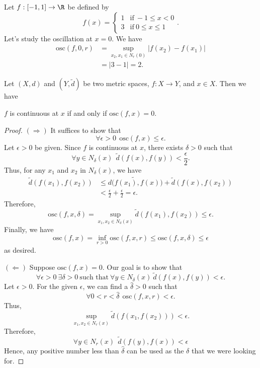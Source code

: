 \begin{eg}
    Let \( f:[-1,1] \to \R  \) be defined by 
    \[  f(x) = 
    \begin{cases}
        1 &\text{if} \ -1 \leq x < 0 \\ 
        3 &\text{if} \ 0 \leq x \leq 1 
    \end{cases}. \]
    Let's study the oscillation at \( x = 0  \). We have 
    \begin{align*}
        \text{osc}(f,0,r) &=  \sup_{{x}_{2},{x}_{1} \in {N}_{r}(0) } | f({x}_{2}) - f({x}_{1}) | \\
                          &= |  3 - 1  |  = 2.
    \end{align*}
\end{eg}

\begin{theorem}[ ]
    Let \( (X,d) \) and \( (Y, \tilde{d}) \) be two metric spaces, \( f: X \to Y  \), and \( x \in X  \). Then we have
    \begin{center}
        \( f  \) is continuous at \( x  \) if and only if \( \text{osc}(f,x) = 0 \).
    \end{center}
\end{theorem}
\begin{proof}
\( (\Longrightarrow) \) It suffices to show that 
\[  \forall \epsilon > 0 \ \ \text{osc}(f,x) \leq \epsilon. \]
Let \( \epsilon > 0  \) be given. Since \( f  \) is continuous at \( x  \), there exists \( \delta > 0  \) such that  
\[  \forall y \in {N}_{\delta}(x) \ \ \tilde{d}(f(x), f(y)) < \frac{ \epsilon }{ 2 }. \]
Thus, for any \( {x}_{1} \) and \( {x}_{2}  \) in \( {N}_{\delta}(x)  \), we have 
\begin{align*}
    \tilde{d}(f({x}_{1}), f({x}_{2})) &\leq \tilde{d(f({x}_{1}), f(x)} ) + \tilde{d}(f(x), f({x}_{2})) \\
                                      &< \frac{ \epsilon }{ 2 }  + \frac{ \epsilon }{ 2 }  = \epsilon.
\end{align*}
Therefore, 
\[  \text{osc}(f,x,\delta) = \sup_{{x}_{1}, {x}_{2} \in {N}_{\delta}(x)} \tilde{d}(f({x}_{1}), f({x}_{2})) \leq \epsilon. \]
Finally, we have 
\[  \text{osc}(f,x) = \inf_{r > 0} \text{osc}(f,x,r) \leq \text{osc}(f,x,\delta) \leq \epsilon \]
as desired.

\( (\Longleftarrow) \) Suppose \( \text{osc}(f,x) = 0  \). Our goal is to show that 
\[  \forall \epsilon > 0 \ \exists \delta > 0 \ \text{such that} \ \forall y \in {N}_{\delta}(x) \ \tilde{d}(f(x) , f(y)) < \epsilon. \tag{*} \]
Let \( \epsilon > 0  \). For the given \( \epsilon  \), we can find a \( \hat{\delta} > 0  \) such that  
\[  \forall 0 < r < \hat{\delta} \ \ \text{osc}(f,x,r) < \epsilon. \]
Thus, 
\[  \sup_{{x}_{1}, {x}_{2} \in {N}_{r}(x)} \tilde{d}(f({x}_{1}, f({x}_{2})))  < \epsilon. \]
Therefore,  
\[  \forall y \in {N}_{r}(x) \ \ \tilde{d} (f(y) , f(x)) < \epsilon \]
Hence, any positive number less than \( \hat{\delta}  \) can be used as the \( \delta  \) that we were looking for.
\end{proof}
